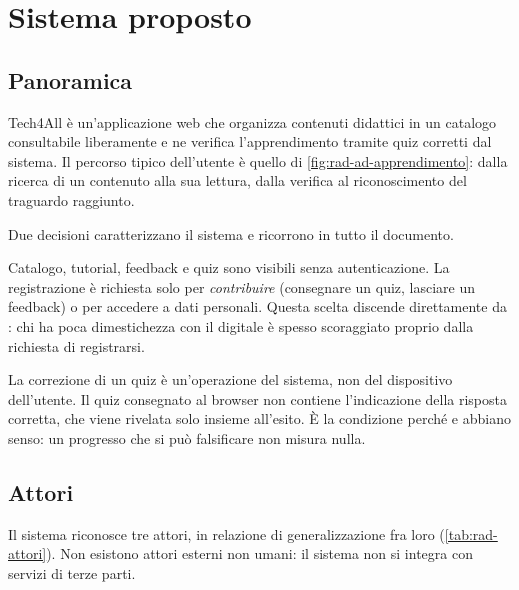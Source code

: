 \chapter{Sistema proposto}
\label{cap:rad-sistema-proposto}

\section{Panoramica}

Tech4All è un'applicazione web che organizza contenuti didattici in un
catalogo consultabile liberamente e ne verifica l'apprendimento tramite quiz
corretti dal sistema. Il percorso tipico dell'utente è quello di
\cref{fig:rad-ad-apprendimento}: dalla ricerca di un contenuto alla sua
lettura, dalla verifica al riconoscimento del traguardo raggiunto.

Due decisioni caratterizzano il sistema e ricorrono in tutto il documento.

\begin{description}[leftmargin=1.2cm,style=nextline]
  \item[Consultazione libera] Catalogo, tutorial, feedback e quiz sono
    visibili senza autenticazione. La registrazione è richiesta solo per
    \emph{contribuire} (consegnare un quiz, lasciare un feedback) o per
    accedere a dati personali. Questa scelta discende direttamente da
    : chi ha poca dimestichezza con il digitale è spesso scoraggiato
    proprio dalla richiesta di registrarsi.
  \item[Verifica non aggirabile] La correzione di un quiz è un'operazione del
    sistema, non del dispositivo dell'utente. Il quiz consegnato al browser
    non contiene l'indicazione della risposta corretta, che viene rivelata
    solo insieme all'esito. È la condizione perché  e 
    abbiano senso: un progresso che si può falsificare non misura nulla.
\end{description}


\section{Attori}
\label{sec:rad-attori}

Il sistema riconosce tre attori, in relazione di generalizzazione fra loro
(\cref{tab:rad-attori}). Non esistono attori esterni non umani: il sistema non
si integra con servizi di terze parti.

